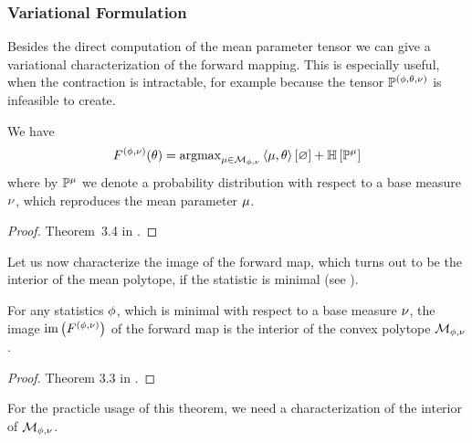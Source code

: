 \subsubsection{Variational Formulation}

Besides the direct computation of the mean parameter tensor we can give a variational characterization of the forward mapping.
This is especially useful, when the contraction is intractable, for example because the tensor $\mathbb{P}^{(\phi,\theta,\nu)}$ is infeasible to create.

\begin{theorem}
	We have
	\begin{align*}
		F^{(\phi,\nu)}(\theta)
		  = \mathrm{argmax}_{\mu\in\mathcal{M}_{\phi,\nu}}  \left\langle \mu,\theta\right\rangle \left[ \varnothing \right] + \mathbb{H}\left[\mathbb{P}^{\mu}\right] 
	\end{align*}
	where by $\mathbb{P}^{\mu}$ we denote a probability distribution with respect to a base measure $\nu$, which reproduces the mean parameter $\mu$.
\end{theorem}
\begin{proof}
	Theorem~3.4 in \cite{wainwright_graphical_2008}.
\end{proof}

Let us now characterize the image of the forward map, which turns out to be the interior of the mean polytope, if the statistic is minimal (see ).

\begin{theorem}\label{the:meanPolytopeInterior}
	For any statistics $\phi$, which is minimal with respect to a base measure $\nu$, the image $\mathrm{im}\left(F^{(\phi,\nu)}\right)$ of the forward map is the interior of the convex polytope $\mathcal{M}_{\phi,\nu}$.
\end{theorem}
\begin{proof}
	Theorem 3.3 in \cite{wainwright_graphical_2008}.
\end{proof}

For the practicle usage of this theorem, we need a characterization of the interior of $\mathcal{M}_{\phi,\nu}$.

